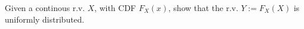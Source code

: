 \begin{question}
\label{q:mml-6.13}

Given a continous r.v. $X$, with CDF $F_X(x)$, show that the r.v. $Y:=F_X(X)$ is uniformly distributed.

\end{question}

%
%
